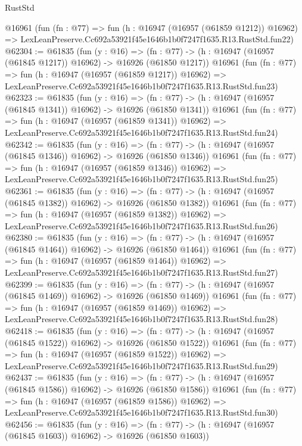 \begin{lexlean}{RustStd}
\begin{coremodule}
    @16961
    (fun (fn : @77) =>
    fun (h : @16947 (@16957 (@61859 @1212)) @16962) =>
    LexLeanPreserve.Cc692a53921f45e1646b1b0f7247f1635.R13.RustStd.fun22)
@62304 := @61835
    (fun (y : @16) =>
    (fn : @77) -> (h : @16947 (@16957 (@61845 @1217)) @16962) -> @16926 (@61850 @1217))
    @16961
    (fun (fn : @77) =>
    fun (h : @16947 (@16957 (@61859 @1217)) @16962) =>
    LexLeanPreserve.Cc692a53921f45e1646b1b0f7247f1635.R13.RustStd.fun23)
@62323 := @61835
    (fun (y : @16) =>
    (fn : @77) -> (h : @16947 (@16957 (@61845 @1341)) @16962) -> @16926 (@61850 @1341))
    @16961
    (fun (fn : @77) =>
    fun (h : @16947 (@16957 (@61859 @1341)) @16962) =>
    LexLeanPreserve.Cc692a53921f45e1646b1b0f7247f1635.R13.RustStd.fun24)
@62342 := @61835
    (fun (y : @16) =>
    (fn : @77) -> (h : @16947 (@16957 (@61845 @1346)) @16962) -> @16926 (@61850 @1346))
    @16961
    (fun (fn : @77) =>
    fun (h : @16947 (@16957 (@61859 @1346)) @16962) =>
    LexLeanPreserve.Cc692a53921f45e1646b1b0f7247f1635.R13.RustStd.fun25)
@62361 := @61835
    (fun (y : @16) =>
    (fn : @77) -> (h : @16947 (@16957 (@61845 @1382)) @16962) -> @16926 (@61850 @1382))
    @16961
    (fun (fn : @77) =>
    fun (h : @16947 (@16957 (@61859 @1382)) @16962) =>
    LexLeanPreserve.Cc692a53921f45e1646b1b0f7247f1635.R13.RustStd.fun26)
@62380 := @61835
    (fun (y : @16) =>
    (fn : @77) -> (h : @16947 (@16957 (@61845 @1464)) @16962) -> @16926 (@61850 @1464))
    @16961
    (fun (fn : @77) =>
    fun (h : @16947 (@16957 (@61859 @1464)) @16962) =>
    LexLeanPreserve.Cc692a53921f45e1646b1b0f7247f1635.R13.RustStd.fun27)
@62399 := @61835
    (fun (y : @16) =>
    (fn : @77) -> (h : @16947 (@16957 (@61845 @1469)) @16962) -> @16926 (@61850 @1469))
    @16961
    (fun (fn : @77) =>
    fun (h : @16947 (@16957 (@61859 @1469)) @16962) =>
    LexLeanPreserve.Cc692a53921f45e1646b1b0f7247f1635.R13.RustStd.fun28)
@62418 := @61835
    (fun (y : @16) =>
    (fn : @77) -> (h : @16947 (@16957 (@61845 @1522)) @16962) -> @16926 (@61850 @1522))
    @16961
    (fun (fn : @77) =>
    fun (h : @16947 (@16957 (@61859 @1522)) @16962) =>
    LexLeanPreserve.Cc692a53921f45e1646b1b0f7247f1635.R13.RustStd.fun29)
@62437 := @61835
    (fun (y : @16) =>
    (fn : @77) -> (h : @16947 (@16957 (@61845 @1586)) @16962) -> @16926 (@61850 @1586))
    @16961
    (fun (fn : @77) =>
    fun (h : @16947 (@16957 (@61859 @1586)) @16962) =>
    LexLeanPreserve.Cc692a53921f45e1646b1b0f7247f1635.R13.RustStd.fun30)
@62456 := @61835
    (fun (y : @16) =>
    (fn : @77) -> (h : @16947 (@16957 (@61845 @1603)) @16962) -> @16926 (@61850 @1603))

\end{coremodule}
\end{lexlean}
